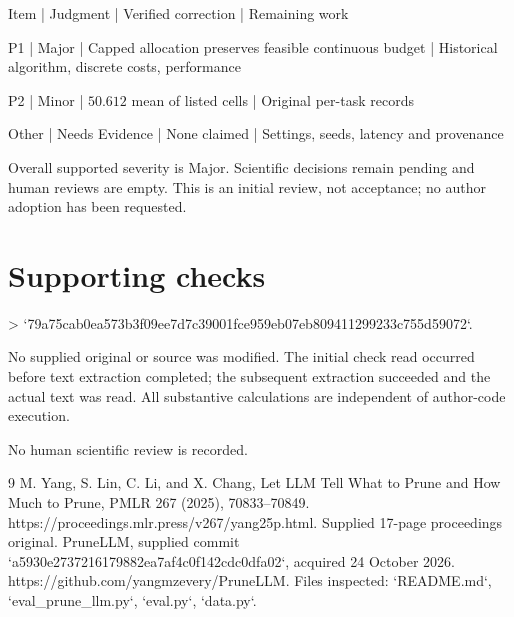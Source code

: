 \documentclass[10pt]{article}
\begin{document}
Item | Judgment | Verified correction | Remaining work\par
P1 | Major | Capped allocation preserves feasible continuous budget | Historical algorithm, discrete costs, performance\par
P2 | Minor | \(50.612\) mean of listed cells | Original per-task records\par
Other | Needs Evidence | None claimed | Settings, seeds, latency and provenance\par
Overall supported severity is Major. Scientific decisions remain pending and human reviews are empty. This is an initial review, not acceptance; no author adoption has been requested.\par
\section*{Supporting checks}
> `79a75cab0ea573b3f09ee7d7c39001fce959eb07eb809411299233c755d59072`.\par
No supplied original or source was modified. The initial check read occurred before text extraction completed; the subsequent extraction succeeded and the actual text was read. All substantive calculations are independent of author-code execution.\par
No human scientific review is recorded.\par
9 M. Yang, S. Lin, C. Li, and X. Chang, Let LLM Tell What to Prune and How Much to Prune, PMLR 267 (2025), 70833–70849. https://proceedings.mlr.press/v267/yang25p.html. Supplied 17-page proceedings original. PruneLLM, supplied commit `a5930e2737216179882ea7af4c0f142cdc0dfa02`, acquired 24 October 2026. https://github.com/yangmzevery/PruneLLM. Files inspected: `README.md`, `eval\_prune\_llm.py`, `eval.py`, `data.py`.\par
\end{document}
